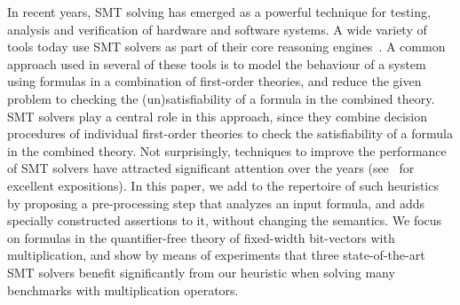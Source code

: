 %
In recent years, SMT solving has emerged as a powerful technique for
testing, analysis and verification of hardware and software systems.
A wide variety of tools today use SMT solvers as part of their core
reasoning
engines~\cite{hwcbmc,boolector,ebmc,cbmc,corral,boogie,crv1,crv2,dart,concolic}.
A common approach used in several of these tools is to model the
behaviour of a system using formulas in a combination of first-order
theories, and reduce the given problem to checking the
(un)satisfiability of a formula in the combined theory.  SMT solvers
play a central role in this approach, since they combine decision
procedures of individual first-order theories to check the
satisfiability of a formula in the combined theory.  Not surprisingly,
techniques to improve the performance of SMT solvers have attracted
significant attention over the years %
(see~\cite{barrett,deMoura2013} for excellent expositions).  In this
paper, we add to the repertoire of such heuristics by proposing a
pre-processing step that analyzes an input formula, and adds specially
constructed assertions to it, without changing the semantics. We focus
on formulas in the quantifier-free theory of fixed-width bit-vectors
with multiplication, and show by means of experiments that three
state-of-the-art SMT solvers benefit significantly from our heuristic
when solving many benchmarks with multiplication operators.%


